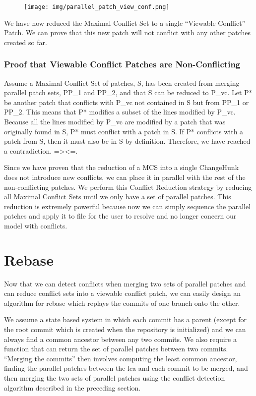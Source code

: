 \documentclass[]{article}
\makeatletter
\def\maxwidth{\ifdim\Gin@nat@width>\linewidth\linewidth
\else\Gin@nat@width\fi}
\let\Oldincludegraphics\includegraphics
\renewcommand{\includegraphics}[1]{\Oldincludegraphics[width=\maxwidth]{#1}}
\makeatother
\begin{document}
\begin{figure}[Figure 6]
\centering
\texttt{[image: img/parallel\_patch\_view\_conf.png]}
\caption{}
\end{figure}

We have now reduced the Maximal Conflict Set to a single ``Viewable
Conflict'' Patch. We can prove that this new patch will not conflict
with any other patches created so far.

\subsubsection{Proof that Viewable Conflict Patches are Non-Conflicting}

Assume a Maximal Conflict Set of patches, S, has been created from
merging parallel patch sets, PP\_1 and PP\_2, and that S can be reduced
to P\_vc. Let P* be another patch that conflicts with P\_vc not
contained in S but from PP\_1 or PP\_2. This means that P* modifies a
subset of the lines modified by P\_vc. Because all the lines modified by
P\_vc are modified by a patch that was originally found in S, P* must
conflict with a patch in S. If P* conflicts with a patch from S, then it
must also be in S by definition. Therefore, we have reached a
contradiction. =\textgreater{}\textless{}=.

Since we have proven that the reduction of a MCS into a single
ChangeHunk does not introduce new conflicts, we can place it in parallel
with the rest of the non-conflicting patches. We perform this Conflict
Reduction strategy by reducing all Maximal Conflict Sets until we only
have a set of parallel patches. This reduction is extremely powerful
because now we can simply sequence the parallel patches and apply it to
file for the user to resolve and no longer concern our model with
conflicts.

\section{Rebase}

Now that we can detect conflicts when merging two sets of parallel
patches and can reduce conflict sets into a viewable conflict patch, we
can easily design an algorithm for rebase which replays the commits of
one branch onto the other.

We assume a state based system in which each commit has a parent (except
for the root commit which is created when the repository is initialized)
and we can always find a common ancestor between any two commits. We
also require a function that can return the set of parallel patches
between two commits. ``Merging the commits'' then involves computing the
least common ancestor, finding the parallel patches between the lca and
each commit to be merged, and then merging the two sets of parallel
patches using the conflict detection algorithm described in the
preceding section.
\end{document}
